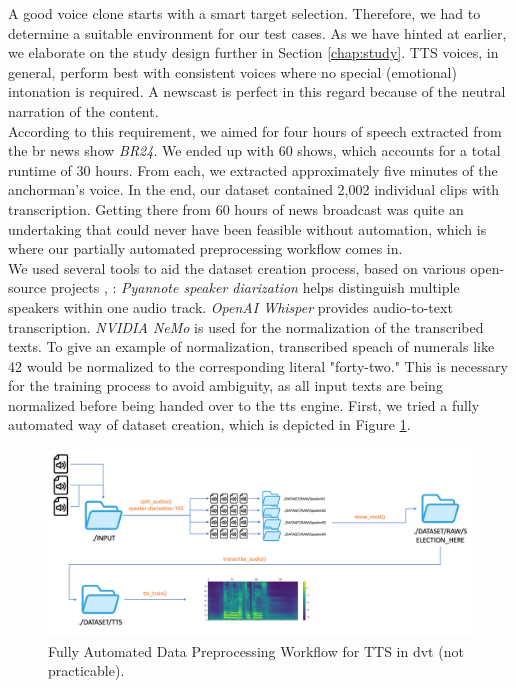 \documentclass[
  a4paper,  %
  twoside,  %
  bibliography=totoc,
  headsepline,
  cleardoublepage=empty,
  parskip=half,
  draft=false
]{scrbook}
\begin{document}
A good voice clone starts with a smart target selection. Therefore, we had to determine a suitable environment for our test cases. As we have hinted at earlier, we elaborate on the study design further in Section \ref{chap:study}. TTS voices, in general, perform best with consistent voices where no special (emotional) intonation is required. A newscast is perfect in this regard because of the neutral narration of the content. \\
According to this requirement, we aimed for four hours of speech extracted from the \gls{br} news show \textit{BR24}. We ended up with 60 shows, which accounts for a total runtime of 30 hours. From each, we extracted approximately five minutes of the anchorman's voice. In the end, our dataset contained 2,002 individual clips with transcription. Getting there from 60 hours of news broadcast was quite an undertaking that could never have been feasible without automation, which is where our partially automated preprocessing workflow comes in. \\
We used several tools to aid the dataset creation process, based on various open-source projects \cite{micaAudioSplitterUsing2023}, \cite{harperEndtoEndToolkitVoice2023}: \textit{Pyannote speaker diarization} helps distinguish multiple speakers within one audio track. \textit{OpenAI Whisper} provides audio-to-text transcription. \textit{NVIDIA NeMo} is used for the normalization of the transcribed texts. To give an example of normalization, transcribed speach of numerals like 42 would be normalized to the corresponding literal "forty-two." This is necessary for the training process to avoid ambiguity, as all input texts are being normalized before being handed over to the \gls{tts} engine. First, we tried a fully automated way of dataset creation, which is depicted in Figure \ref{fig:dvt-tts-original}.

\begin{figure}[h]
  \centering
  \includegraphics[width=1\textwidth]{./graphics/tts/tts dvt only.png}
  \caption{Fully Automated Data Preprocessing Workflow for TTS in \gls{dvt} (not practicable).}
  \label{fig:dvt-tts-original}
\end{figure}
\end{document}
